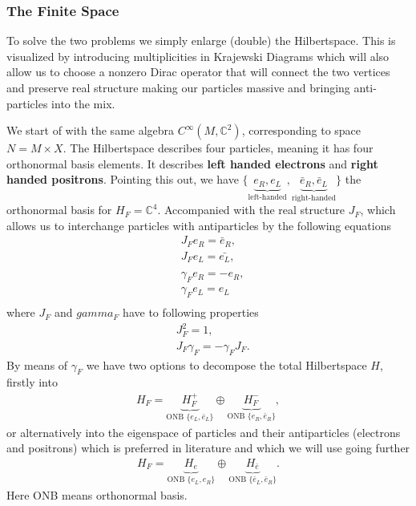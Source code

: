 \subsubsection{The Finite Space}
To solve the two problems we simply enlarge (double) the Hilbertspace. This
is visualized by introducing multiplicities in Krajewski Diagrams which will also
allow us to choose a nonzero Dirac operator that will connect the two
vertices and preserve real structure making our particles massive and
bringing anti-particles into the mix.

We start of with the same algebra $C^\infty(M, \mathbb{C}^2)$, corresponding
to space $N= M\times X$. The Hilbertspace describes four particles, meaning
it has four orthonormal basis elements. It describes \textbf{left handed
electrons} and \textbf{right handed positrons}. Pointing this out, we have
$\{ \underbrace{e_R, e_L}_{\text{left-handed}}, \underbrace{\bar{e}_R,
\bar{e}_L}_{\text{right-handed}}\}$ the orthonormal basis for $H_F =
\mathbb{C}^4$. Accompanied with the real structure $J_F$, which allows us to
interchange particles with antiparticles by the following equations
\begin{align}
    &J_F e_R = \bar{e}_R, \\
    &J_F e_L = \bar{e_L}, \\
    \nonumber \\
    &\gamma _F e_R = -e_R,\\
    &\gamma_F e_L = e_L \\
\end{align}
where $J_F$ and $gamma_F$ have to following properties
\begin{align}
    &J_F^2 = 1,\\
    & J_F \gamma_F  = - \gamma_F J_F.
\end{align}
By means of $\gamma_F$ we have two options to decompose the total
Hilbertspace $H$, firstly into
\begin{align}
    H_F = \underbrace{H_F^+}_{\text{ONB } \{e_L, \bar{e}_L\}}
    \oplus \underbrace{H_F^-}_{\text{ONB } \{e_R, \bar{e}_R\}},
\end{align}
or alternatively into the eigenspace of particles and their
antiparticles (electrons and positrons) which is preferred in literature and
which we will use going further
\begin{align}
    H_F = \underbrace{H_{e}}_{\text{ONB } \{e_L, e_R\}} \oplus
    \underbrace{H_{\bar{e}}}_{\text{ONB } \{\bar{e}_L, \bar{e}_R\}}.
\end{align}
Here ONB means orthonormal basis.

